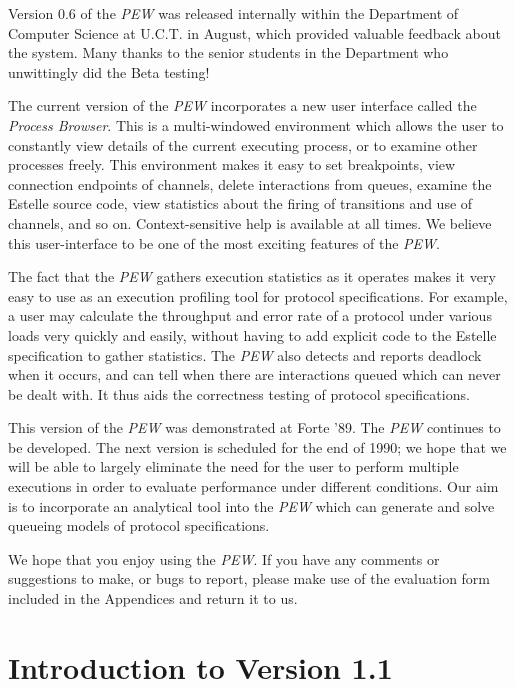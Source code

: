 Version 0.6 of the {\em PEW} was released internally within the 
Department of Computer Science at U.C.T. in August, which provided
valuable feedback about the system. Many thanks to the
senior students in the Department who unwittingly did the Beta
testing!

The current version of the {\em PEW} incorporates a new user
interface called the {\em Process Browser}. This is a multi-windowed
environment which allows the user to constantly view details of the
current executing process, or to examine other processes freely. This
environment makes it easy to set breakpoints, view connection
endpoints of channels, delete interactions from queues, examine the
Estelle source code, view statistics about the firing of transitions
and use of channels, and so on. Context-sensitive help is available
at all times. We believe this user-interface to be one of the most
exciting features of the {\em PEW}.

The fact that the {\em PEW} gathers execution statistics as it
operates makes it very easy to use as an execution profiling tool for
protocol specifications. For example, a user may calculate the
throughput and error rate of a protocol under various loads very
quickly and easily, without having to add explicit code to the
Estelle specification to gather statistics. The {\em PEW} also
detects and reports deadlock when it occurs, and can tell when there are
interactions queued which can never be dealt with. It thus aids the
correctness testing of protocol specifications.

This version of the {\em PEW} was demonstrated at Forte '89.
The {\em PEW} continues to be developed.
The next version is scheduled for
the end of 1990; we hope that we will be able to largely eliminate
the need for the user to perform multiple executions in order to
evaluate performance under different conditions. Our aim is to
incorporate an analytical tool into the {\em PEW} which can generate
and solve queueing models of protocol specifications.

We hope that you enjoy using the {\em PEW}. If you have any comments
or suggestions to make, or bugs to report, please make use of the
evaluation form included in the Appendices and return it to us.
         
\section[Introduction to Version 1.1]{Introduction to Version 1.1}

